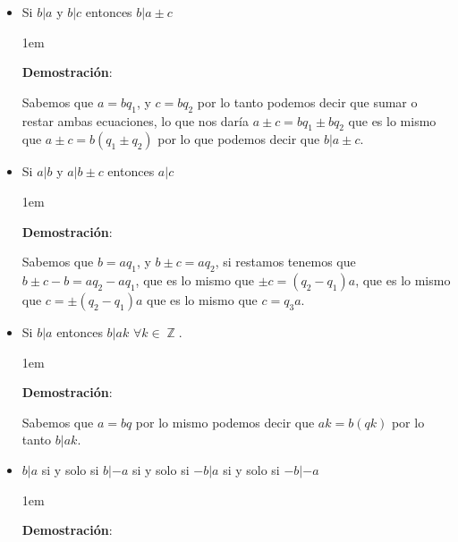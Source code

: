 \documentclass[12pt]{report}                                    %
\newenvironment{SmallIndentation}[1][0.75em]                    %
    {\begin{adjustwidth}{#1}{}\begin{footnotesize}}                 %
    {\end{footnotesize}\end{adjustwidth}}                           %
\DeclareMathOperator \Integers  {\mathbb{Z}}                     %
\begin{document}
\begin{itemize}
                \clearpage

                \item Si $b|a$ y $b|c$ entonces $b|a \pm c$

                    \begin{SmallIndentation}[1em]
                        \textbf{Demostración}:

                        Sabemos que $a=bq_1$, y $c=bq_2$ por lo tanto podemos decir que
                        sumar o restar ambas ecuaciones, lo que nos daría
                        $a \pm c = bq_1 \pm bq_2$ que es lo mismo que
                        $a \pm c = b (q_1 \pm q_2)$ por lo que podemos decir que $b|a \pm c$.

                    \end{SmallIndentation}

                \item Si $a|b$ y $a|b \pm c$ entonces $a|c$

                    \begin{SmallIndentation}[1em]
                        \textbf{Demostración}:

                        Sabemos que $b=aq_1$, y $b \pm c=aq_2$, si restamos tenemos que
                        $b \pm c -b = aq_2 - aq_1$, que es lo mismo que $\pm c = (q_2-q_1)a$,
                        que es lo mismo que $c = \pm(q_2-q_1)a$ que es lo mismo que $c = q_3a$.

                    \end{SmallIndentation}

                \item Si $b|a$ entonces $b|ak$ $\forall k \in \Integers$.

                    \begin{SmallIndentation}[1em]
                        \textbf{Demostración}:

                        Sabemos que $a=bq$ por lo mismo podemos decir que
                        $ak=b(qk)$ por lo tanto $b|ak$.

                    \end{SmallIndentation}

                \item $b|a$ si y solo si $b|-a$ si y solo si $-b|a$ si y solo si $-b|-a$

                    \begin{SmallIndentation}[1em]
                        \textbf{Demostración}:


\end{SmallIndentation}
\end{itemize}
\end{document}
